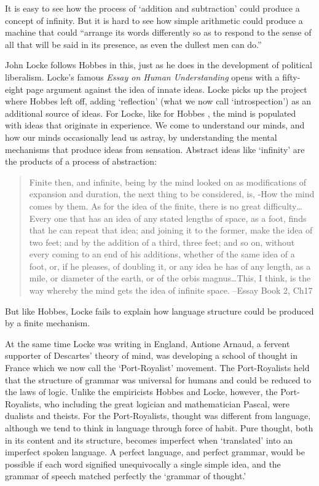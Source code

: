 It is easy to see how the process of `addition and subtraction' could produce a concept of infinity. But it is hard to see how simple arithmetic could produce a machine that could ``arrange its words differently so as to respond to the sense of all that will be said in its presence, as even the dullest men can do.''

John Locke follows Hobbes in this, just as he does in the development of political liberalism. Locke's famous \emph{Essay on Human Understanding} opens with a fifty-eight page argument against the idea of innate ideas. Locke picks up the project where Hobbes left off, adding `reflection' (what we now call `introspection') as an additional source of ideas. For Locke, like for Hobbes , the mind is populated with ideas that originate in experience. We come to understand our minds, and how our minds occasionally lead us astray, by understanding the mental mechanisms that produce ideas from sensation. Abstract ideas like `infinity' are the products of a process of abstraction:

\begin{quote}

Finite then, and infinite, being by the mind looked on as modifications of expansion and duration, the next thing to be considered, is, -How the mind comes by them. As for the idea of the finite, there is no great difficulty{\ldots}Every one that has an idea of any stated lengths of space, as a foot, finds that he can repeat that idea; and joining it to the former, make the idea of two feet; and by the addition of a third, three feet; and so on, without every coming to an end of his additions, whether of the same idea of a foot, or, if he pleases, of doubling it, or any idea he has of any length, as a mile, or diameter of the earth, or of the orbis magnus{\ldots}This, I think, is the way whereby the mind gets the idea of infinite space. --Essay Book 2, Ch17
\end{quote}

But like Hobbes, Locke fails to explain how language structure could be produced by a finite mechanism.

At the same time Locke was writing in England, Antione Arnaud, a fervent supporter of Descartes' theory of mind, was developing a school of thought in France which we now call the `Port-Royalist' movement. The Port-Royalists held that the structure of grammar was universal for humans and could be reduced to the laws of logic. Unlike the empiricists Hobbes and Locke, however, the Port-Royalists, who including the great logician and mathematician Pascal, were dualists and theists. For the Port-Royalists, thought was different from language, although we tend to think in language through force of habit. Pure thought, both in its content and its structure, becomes imperfect when `translated' into an imperfect spoken language. A perfect language, and perfect grammar, would be possible if each word signified unequivocally a single simple idea, and the grammar of speech matched perfectly the `grammar of thought.' 

